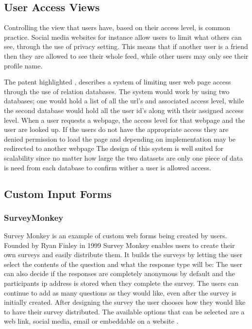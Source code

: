 \documentclass[12pt]{article}  %
\begin{document}
\newpage
\subsection{User Access Views}

Controlling the view that users have, based on their access level, is common practice. Social media websites for instance allow users to limit what others  can see, through the use of privacy setting. This means that if another user is a friend then they are allowed to see their whole feed, while other users may only see their profile name.

The patent highlighted \cite{baker_system_1997}, describes a system of limiting user web page access through the use of relation databases. The system would work by using two databases; one would hold a list of all the url's and associated access level, while the second database would hold all the user id's along with their assigned access level. When a user requests a webpage, the access level for that webpage and the user are looked up. If the users do not have the appropriate access they are denied permission to load the page and depending on implementation may be redirected to another webpage
The design of this system is well suited for scalability since no matter how large the two datasets are only one piece of data is need from each database to confirm wither a user is allowed access.


\subsection{Custom Input Forms}

\subsubsection{SurveyMonkey}
Survey Monkey \cite{finley_surveymonkey_1999} is an example of custom web forms being created by users. Founded by Ryan Finley in 1999 Survey Monkey enables users to create their own surveys and easily distribute them. It builds the surveys by letting the user select the contents of the question and what the response type will be: The user can also decide if the responses are completely anonymous by default and the participants ip address is stored when they complete the survey. The users can continue to add as many questions as they would like, even after the survey is initially created. After designing the survey the user chooses how they would like to have their survey distributed. The available options that can be selected are a web link, social media, email or embeddable on a website \cite{waclawski_how_2012} . 
\end{document}
